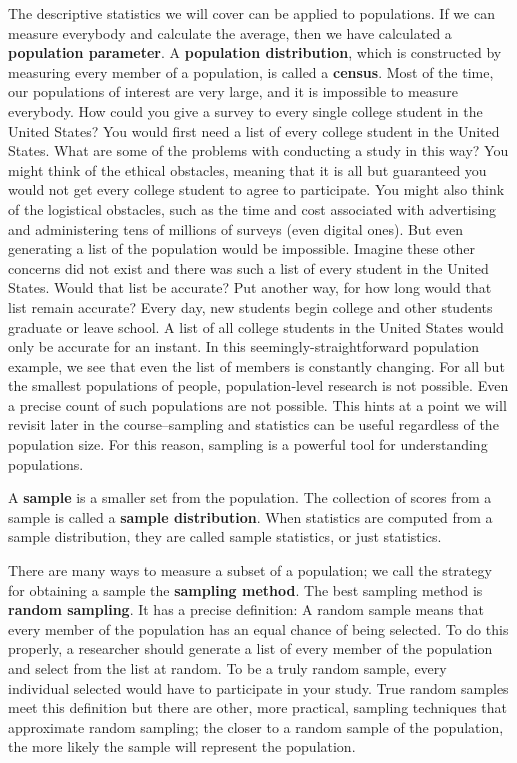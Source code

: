 \documentclass[
]{book}
\begin{document}
The descriptive statistics we will cover can be applied to populations. If we can measure everybody and calculate the average, then we have calculated a \textbf{population parameter}. A \textbf{population distribution}, which is constructed by measuring every member of a population, is called a \textbf{census}. Most of the time, our populations of interest are very large, and it is impossible to measure everybody. How could you give a survey to every single college student in the United States? You would first need a list of every college student in the United States. What are some of the problems with conducting a study in this way? You might think of the ethical obstacles, meaning that it is all but guaranteed you would not get every college student to agree to participate. You might also think of the logistical obstacles, such as the time and cost associated with advertising and administering tens of millions of surveys (even digital ones). But even generating a list of the population would be impossible. Imagine these other concerns did not exist and there was such a list of every student in the United States. Would that list be accurate? Put another way, for how long would that list remain accurate? Every day, new students begin college and other students graduate or leave school. A list of all college students in the United States would only be accurate for an instant. In this seemingly-straightforward population example, we see that even the list of members is constantly changing. For all but the smallest populations of people, population-level research is not possible. Even a precise count of such populations are not possible. This hints at a point we will revisit later in the course--sampling and statistics can be useful regardless of the population size. For this reason, sampling is a powerful tool for understanding populations.

A \textbf{sample} is a smaller set from the population. The collection of scores from a sample is called a \textbf{sample distribution}. When statistics are computed from a sample distribution, they are called sample statistics, or just statistics.

There are many ways to measure a subset of a population; we call the strategy for obtaining a sample the \textbf{sampling method}. The best sampling method is \textbf{random sampling}. It has a precise definition: A random sample means that every member of the population has an equal chance of being selected. To do this properly, a researcher should generate a list of every member of the population and select from the list at random. To be a truly random sample, every individual selected would have to participate in your study. True random samples meet this definition but there are other, more practical, sampling techniques that approximate random sampling; the closer to a random sample of the population, the more likely the sample will represent the population.
\end{document}
